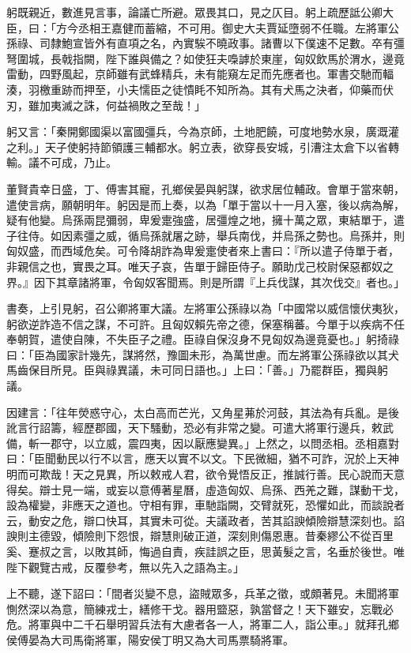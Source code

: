 \begin{pinyinscope}
躬既親近，數進見言事，論議亡所避。眾畏其口，見之仄目。躬上疏歷詆公卿大臣，曰：「方今丞相王嘉健而蓄縮，不可用。御史大夫賈延墮弱不任職。左將軍公孫祿、司隸鮑宣皆外有直項之名，內實騃不曉政事。諸曹以下僕速不足數。卒有彊弩圍城，長戟指闕，陛下誰與備之？如使狂夫嘄謼於東崖，匈奴飲馬於渭水，邊竟雷動，四野風起，京師雖有武蜂精兵，未有能窺左足而先應者也。軍書交馳而輻湊，羽檄重跡而押至，小夫懦臣之徒憒眊不知所為。其有犬馬之決者，仰藥而伏刃，雖加夷滅之誅，何益禍敗之至哉！」

躬又言：「秦開鄭國渠以富國彊兵，今為京師，土地肥饒，可度地勢水泉，廣溉灌之利。」天子使躬持節領護三輔都水。躬立表，欲穿長安城，引漕注太倉下以省轉輸。議不可成，乃止。

董賢貴幸日盛，丁、傅害其寵，孔鄉侯晏與躬謀，欲求居位輔政。會單于當來朝，遣使言病，願朝明年。躬因是而上奏，以為「單于當以十一月入塞，後以病為解，疑有他變。烏孫兩昆彌弱，卑爰疐強盛，居彊煌之地，擁十萬之眾，東結單于，遣子往侍。如因素彊之威，循烏孫就屠之跡，舉兵南伐，并烏孫之勢也。烏孫并，則匈奴盛，而西域危矣。可令降胡詐為卑爰疐使者來上書曰：『所以遣子侍單于者，非親信之也，實畏之耳。唯天子哀，告單于歸臣侍子。願助戊己校尉保惡都奴之界。』因下其章諸將軍，令匈奴客聞焉。則是所謂『上兵伐謀，其次伐交』者也。」

書奏，上引見躬，召公卿將軍大議。左將軍公孫祿以為「中國常以威信懷伏夷狄，躬欲逆詐造不信之謀，不可許。且匈奴賴先帝之德，保塞稱蕃。今單于以疾病不任奉朝賀，遣使自陳，不失臣子之禮。臣祿自保沒身不見匈奴為邊竟憂也。」躬掎祿曰：「臣為國家計幾先，謀將然，豫圖未形，為萬世慮。而左將軍公孫祿欲以其犬馬齒保目所見。臣與祿異議，未可同日語也。」上曰：「善。」乃罷群臣，獨與躬議。

因建言：「往年熒惑守心，太白高而芒光，又角星茀於河鼓，其法為有兵亂。是後訛言行詔籌，經歷郡國，天下騷動，恐必有非常之變。可遣大將軍行邊兵，敕武備，斬一郡守，以立威，震四夷，因以厭應變異。」上然之，以問丞相。丞相嘉對曰：「臣聞動民以行不以言，應天以實不以文。下民微細，猶不可詐，況於上天神明而可欺哉！天之見異，所以敕戒人君，欲令覺悟反正，推誠行善。民心說而天意得矣。辯士見一端，或妄以意傅著星曆，虛造匈奴、烏孫、西羌之難，謀動干戈，設為權變，非應天之道也。守相有罪，車馳詣闕，交臂就死，恐懼如此，而談說者云，動安之危，辯口快耳，其實未可從。夫議政者，苦其諂諛傾險辯慧深刻也。諂諛則主德毀，傾險則下怨恨，辯慧則破正道，深刻則傷恩惠。昔秦繆公不從百里奚、蹇叔之言，以敗其師，悔過自責，疾詿誤之臣，思黃髮之言，名垂於後世。唯陛下觀覽古戒，反覆參考，無以先入之語為主。」

上不聽，遂下詔曰：「間者災變不息，盜賊眾多，兵革之徵，或頗著見。未聞將軍惻然深以為意，簡練戎士，繕修干戈。器用盬惡，孰當督之！天下雖安，忘戰必危。將軍與中二千石舉明習兵法有大慮者各一人，將軍二人，詣公車。」就拜孔鄉侯傅晏為大司馬衛將軍，陽安侯丁明又為大司馬票騎將軍。


\end{pinyinscope}
